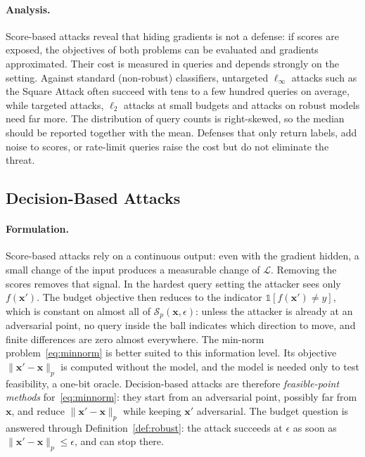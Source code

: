 \documentclass[10pt,a4paper]{extarticle}
\theoremstyle{definition}
\newcommand{\Loss}{\mathcal{L}}
\newcommand{\x}{\mathbf{x}}
\newcommand{\xadv}{\mathbf{x}'}
\begin{document}
\paragraph{Analysis.} Score-based attacks reveal that hiding gradients is not a defense: if scores are exposed, the objectives of both problems can be evaluated and gradients approximated. Their cost is measured in queries and depends strongly on the setting. Against standard (non-robust) classifiers, untargeted \(\ell_\infty\) attacks such as the Square Attack often succeed with tens to a few hundred queries on average, while targeted attacks, \(\ell_2\) attacks at small budgets and attacks on robust models need far more. The distribution of query counts is right-skewed, so the median should be reported together with the mean. Defenses that only return labels, add noise to scores, or rate-limit queries raise the cost but do not eliminate the threat.

\subsection{Decision-Based Attacks}\label{sec:decision}

\paragraph{Formulation.} Score-based attacks rely on a continuous output: even with the gradient hidden, a small change of the input produces a measurable change of \(\Loss\). Removing the scores removes that signal. In the hardest query setting the attacker sees only \(f(\xadv)\). The budget objective then reduces to the indicator \(\mathbb{1}[f(\xadv)\neq y]\), which is constant on almost all of \(\mathcal{S}_p(\x,\epsilon)\): unless the attacker is already at an adversarial point, no query inside the ball indicates which direction to move, and finite differences are zero almost everywhere. The min-norm problem~\eqref{eq:minnorm} is better suited to this information level. Its objective \(\|\xadv-\x\|_p\) is computed without the model, and the model is needed only to test feasibility, a one-bit oracle. Decision-based attacks are therefore \emph{feasible-point methods} for~\eqref{eq:minnorm}: they start from an adversarial point, possibly far from \(\x\), and reduce \(\|\xadv-\x\|_p\) while keeping \(\xadv\) adversarial. The budget question is answered through Definition~\ref{def:robust}: the attack succeeds at \(\epsilon\) as soon as \(\|\xadv-\x\|_p\le\epsilon\), and can stop there.
\end{document}
